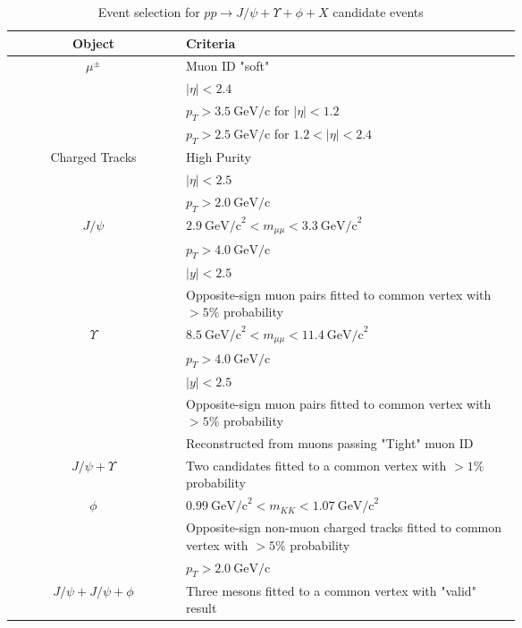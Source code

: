 \documentclass[10pt,twocolumn]{article}
\newcommand*{\GeVc}{~\text{GeV/c}}
\newcommand*{\GeVcs}{~\text{GeV/c}^2}
\begin{document}
\begin{table}[]
    \centering
    \caption{Event selection for $pp\to J/\psi+\Upsilon+\phi+X$ candidate events\\}
    \begin{tabular}{c p{0.66\linewidth}}
        \toprule
        \textbf{Object} & \textbf{Criteria} \\
        \midrule
        $\mu^\pm $ & Muon ID "soft" \\
                  & $|\eta| < 2.4$ \\
                  & $p_T > 3.5\GeVc$ for $|\eta| < 1.2$ \\
                  & $p_T > 2.5\GeVc$ for $1.2 < |\eta| < 2.4$ \\
                  \midrule
        Charged Tracks & High Purity \\
                  & $|\eta|<2.5$ \\
                  & $p_T > 2.0 \GeVc$ \\
        \midrule
        $J/\psi$ & $2.9 \GeVcs < m_{\mu\mu} < 3.3 \GeVcs$ \\
                 & $p_T > 4.0\GeVc$ \\
                 & $|y| < 2.5$ \\
                 & Opposite-sign muon pairs fitted to common vertex with $> 5\%$ probability \\
                 \midrule
        $\Upsilon$ & $8.5\GeVcs < m_{\mu\mu} < 11.4 \GeVcs$ \\
                 & $p_T > 4.0\GeVc$ \\
                 & $|y| < 2.5$ \\
                 & Opposite-sign muon pairs fitted to common vertex with $> 5\%$ probability \\
                 & Reconstructed from muons passing "Tight" muon ID \\
                 \midrule
        $J/\psi+\Upsilon$ & Two candidates fitted to a common vertex with $> 1\%$ probability \\
        \midrule
        $\phi$ & $0.99 \GeVcs < m_{KK} < 1.07 \GeVcs$ \\
               & Opposite-sign non-muon charged tracks fitted to common vertex with $> 5\%$ probability \\
               & $p_T > 2.0\GeVc$ \\
               \midrule
        $J/\psi+J/\psi+\phi$ & Three mesons fitted to a common vertex with "valid" result \\
        \bottomrule
    \end{tabular}
    \label{tab:cut_JpsiYPhi}
\end{table}
\end{document}
